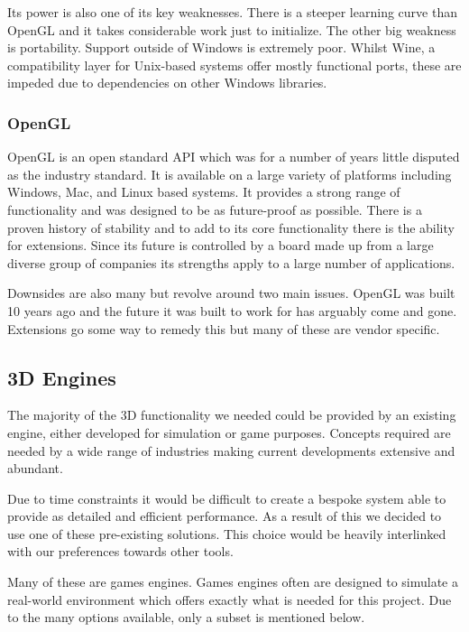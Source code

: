Its power is also one of its key weaknesses. There is a steeper learning
curve than OpenGL and it takes considerable work just to initialize.
The other big weakness is portability. Support outside of Windows is extremely poor. 
Whilst Wine, a compatibility layer for Unix-based
systems offer mostly functional ports, these are impeded due to dependencies
on other Windows libraries.


\subsubsection{OpenGL}

OpenGL is an open standard API which was for a number of years little
disputed as the industry standard. It is available on a large variety
of platforms including Windows, Mac, and Linux based systems. It provides
a strong range of functionality and was designed to be as future-proof
as possible. There is a proven history of stability and to add to
its core functionality there is the ability for extensions. Since
its future is controlled by a board made up from a large diverse group
of companies its strengths apply to a large number of applications.

Downsides are also many but revolve around two main issues. OpenGL
was built 10 years ago and the future it was built to work for has
arguably come and gone. Extensions go some way to remedy this but 
many of these are vendor specific.


\subsection{3D Engines}

The majority of the 3D functionality we needed could be provided by
an existing engine, either developed for simulation or game purposes.
Concepts required are needed by a wide range of industries making
current developments extensive and abundant.

Due to time constraints it would be difficult to create
a bespoke system able to provide as detailed and efficient performance.
As a result of this we decided to use one of these pre-existing solutions.
This choice would be heavily interlinked with our preferences towards
other tools.

Many of these are games engines. Games engines often are
designed to simulate a real-world environment which offers exactly
what is needed for this project. Due to the many options available,
only a subset is mentioned below.


